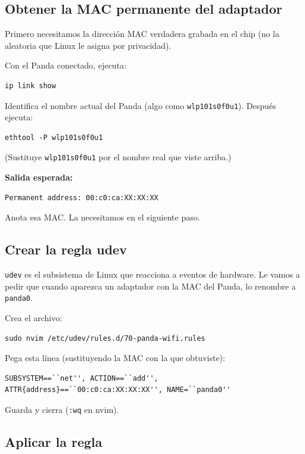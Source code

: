 \documentclass[11pt,a4paper]{article}
\begin{document}
\subsection{Obtener la MAC permanente del adaptador}
Primero necesitamos la dirección MAC verdadera grabada en el chip (no la
aleatoria que Linux le asigna por privacidad).

Con el Panda conectado, ejecuta:

\begin{lstlisting}
ip link show
\end{lstlisting}

Identifica el nombre actual del Panda (algo como \texttt{wlp101s0f0u1}).
Después ejecuta:

\begin{lstlisting}
ethtool -P wlp101s0f0u1
\end{lstlisting}

(Sustituye \texttt{wlp101s0f0u1} por el nombre real que viste arriba.)

\textbf{Salida esperada:}

\begin{lstlisting}
Permanent address: 00:c0:ca:XX:XX:XX
\end{lstlisting}

Anota esa MAC. La necesitamos en el siguiente paso.

\subsection{Crear la regla udev}
\texttt{udev} es el subsistema de Linux que reacciona a eventos de
hardware. Le vamos a pedir que cuando aparezca un adaptador con la MAC
del Panda, lo renombre a \texttt{panda0}.

Crea el archivo:

\begin{lstlisting}
sudo nvim /etc/udev/rules.d/70-panda-wifi.rules
\end{lstlisting}

Pega esta línea (sustituyendo la MAC con la que obtuviste):

\begin{lstlisting}
SUBSYSTEM==``net'', ACTION==``add'', ATTR{address}==``00:c0:ca:XX:XX:XX'', NAME=``panda0''
\end{lstlisting}

Guarda y cierra (\texttt{:wq} en nvim).

\subsection{Aplicar la regla}
\end{document}

